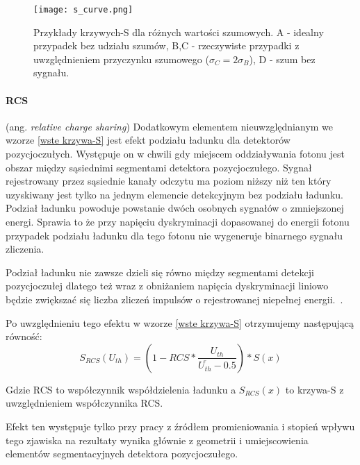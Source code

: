 \begin{figure}
        \centering
        \texttt{[image: s\_curve.png]}
        \caption{Przykłady krzywych-S dla różnych wartości szumowych. A - idealny przypadek bez udziału szumów, B,C - rzeczywiste przypadki z uwzględnieniem przyczynku szumowego ($\sigma_C=2\sigma_B$), D - szum bez sygnału. \cite{wiocek doctorat}} 
        \label{wyk s curve wstep}
\end{figure}

\paragraph{RCS}
(ang. \textit{relative charge sharing})
Dodatkowym elementem nieuwzględnianym we wzorze \ref{wste krzywa-S} jest efekt podziału ładunku dla detektorów pozycjoczułych. Występuje on w chwili gdy miejscem oddziaływania fotonu jest obszar między sąsiednimi segmentami detektora pozycjoczułego. Sygnał rejestrowany przez sąsiednie kanały odczytu ma poziom niższy niż ten który uzyskiwany jest tylko na jednym elemencie detekcyjnym bez podziału ładunku.
Podział ładunku powoduje powstanie dwóch osobnych sygnałów o zmniejszonej energi. Sprawia to że przy napięciu dyskryminacji dopasowanej do energii fotonu przypadek podziału ładunku dla tego fotonu nie wygeneruje binarnego sygnału zliczenia. 

Podział ładunku nie zawsze dzieli się równo między segmentami detekcji pozycjoczułej dlatego też wraz z obniżaniem napięcia dyskryminacji liniowo będzie zwiększać się liczba zliczeń impulsów o rejestrowanej niepełnej energii.~\cite{Monika mag}. 

Po uwzględnieniu tego efektu w wzorze \ref{wste krzywa-S} otrzymujemy następującą równość:
\begin{equation}
        \label{wstep rcs}
        S_{RCS}(U_{th}) = (1-RCS * \frac{U_{th}}{\overline{U_{th}} - 0.5}) * S(x)
\end{equation}

Gdzie RCS to współczynnik współdzielenia ładunku a $S_{RCS}(x)$ to krzywa-S z uwzględnieniem współczynnika RCS.

Efekt ten występuje tylko przy pracy z źródłem promieniowania i stopień wpływu tego zjawiska na rezultaty wynika głównie z geometrii i umiejscowienia elementów segmentacyjnych detektora pozycjoczułego.

